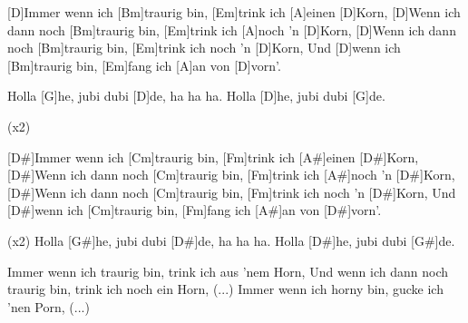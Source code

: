 


\begin{guitar}
	[D]Immer wenn ich [Bm]traurig bin, [Em]trink ich [A]einen [D]Korn,
	[D]Wenn ich dann noch [Bm]traurig bin, [Em]trink ich [A]noch 'n [D]Korn,
	[D]Wenn ich dann noch [Bm]traurig bin, [Em]trink ich noch 'n [D]Korn,
	Und [D]wenn ich [Bm]traurig bin, [Em]fang ich [A]an von [D]vorn'.
	
  \smallskip
	Holla [G]he, jubi dubi [D]de, ha ha ha.
	Holla [D]he, jubi dubi [G]de.
	
	 
	
	  (x2)
	
	[D#]Immer wenn ich [Cm]traurig bin, [Fm]trink ich [A#]einen [D#]Korn,
	[D#]Wenn ich dann noch [Cm]traurig bin, [Fm]trink ich [A#]noch 'n [D#]Korn,
	[D#]Wenn ich dann noch [Cm]traurig bin, [Fm]trink ich noch 'n [D#]Korn,
	Und [D#]wenn ich [Cm]traurig bin, [Fm]fang ich [A#]an von [D#]vorn'.
	
	 (x2)
	Holla [G#]he, jubi dubi [D#]de, ha ha ha.
	Holla [D#]he, jubi dubi [G#]de.

  \medskip
  Immer wenn ich traurig bin, trink ich aus 'nem Horn,
  Und wenn ich dann noch traurig bin, trink ich noch ein Horn,
  (...)
  \smallskip
  Immer wenn ich horny bin, gucke ich 'nen Porn,
  (...)
\end{guitar}
